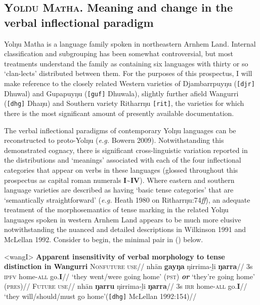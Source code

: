\documentclass[12pt]{article}
\begin{document}
\subsection{\textsc{\textbf{Yolŋu Matha}}. Meaning and change in the verbal inflectional paradigm}\label{yol}

Yolŋu Matha is a language family spoken in northeastern Arnhem Land. Internal classification and subgrouping has been somewhat controversial, but most treatments understand the family as containing six languages with thirty or so `clan-lects' distributed between them. For the purposes of this prospectus, I will make reference to the closely related Western varieties of Djambarrpuyŋu (\texttt{[djr]} Dhuwal) and Gupapuyŋu (\texttt{[guf]} Dhuwala), slightly further afield Wangurri (\texttt{[dhg]} Dhaŋu) and Southern variety Ritharrŋu \texttt{[rit]}, the varieties for which there is the most significant amount of presently available documentation.

The verbal inflectional paradigms of contemporary Yolŋu languages can be reconstructed to proto-Yolŋu (\textit{e.g.} Bowern 2009). Notwithstanding this demonstrated cognacy, there is significant cross-linguistic variation reported in the distributions and `meanings' associated with each of the four inflectional categories that appear on verbs in these languages (glossed throughout this prospectus as capital roman numerals \textbf{I\textasciitilde{}IV}). Where eastern and southern language varieties are described as having `basic tense categories' that are `semantically straightforward' (\textit{e.g.} Heath 1980 on Ritharrŋu:74\textit{ff}), an adequate treatment of the morphosemantics of tense marking in the related Yolŋu languages spoken in western Arnhem Land appears to be much more elusive notwithstanding the nuanced and detailed descriptions in Wilkinson 1991 and McLellan 1992. Consider to begin, the minimal pair in (\nextx) below.

\pex<wangI>\label{wangI} \textbf{Apparent insensitivity of verbal morphology to tense distinction in Wangurri}
\a\begingl
\glpreamble \textsc{Nonfuture use}//
\gla nhän \textbf{gayŋa} ŋirrima-ḻi \textbf{ŋarra}//
\glb 3s \textsc{ipfv} home-\textsc{all} go.\textbf{I}//
\glft`they went/were going home' (\textsc{pst}) \textbf{\textit{or}} `they're going home' (\textsc{pres})//
\endgl 
\a\begingl \glpreamble\textsc{Future use}//
\gla nhän \textbf{ŋarru} ŋirrima-ḻi \textbf{ŋarra}//
\glb 3s \textsc{irr} home-\textsc{all} go.\textbf{I}//
\glft`they will/should/must go home'\hfill(\texttt{[dhg]} McLellan 1992:154)//
\endgl
\xe
\end{document}

